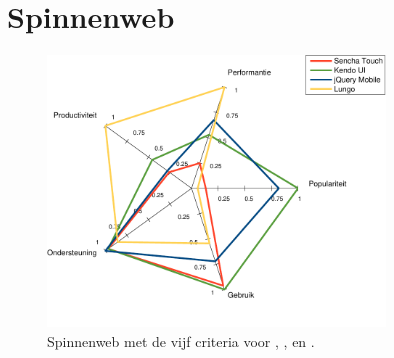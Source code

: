 \section{Spinnenweb}
\label{sec:evaluatie-spinnenweb}

\begin{figure}
  \centering
  \includegraphics[width=0.8\textwidth]{figuren/spidergraph.pdf}
  \caption{Spinnenweb met de vijf criteria voor \st{},  \kendo{},  \jqm{} en \lungo{}.}
  \label{fig:spinnenweb}
\end{figure}
